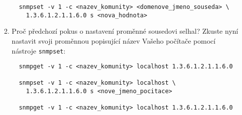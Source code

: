 \begin{itemize}
\begin{enumerate}
\begin{verbatim}
  snmpset -v 1 -c <nazev_komunity> <domenove_jmeno_souseda> \
    1.3.6.1.2.1.1.6.0 s <nova_hodnota>
\end{verbatim}
          \item Proč předchozí pokus o nastavení proměnné sousedovi selhal? Zkuste nyní
          nastavit svoji proměnnou popisující název Vašeho počítače
          pomocí nástroje {\tt snmpset}:
\begin{verbatim}
  snmpget -v 1 -c <nazev_komunity> localhost 1.3.6.1.2.1.1.6.0

  snmpset -v 1 -c <nazev_komunity> localhost \
    1.3.6.1.2.1.1.6.0 s <nove_jmeno_pocitace>

  snmpget -v 1 -c <nazev_komunity> localhost 1.3.6.1.2.1.1.6.0
\end{verbatim}

\end{enumerate}
\end{itemize}

